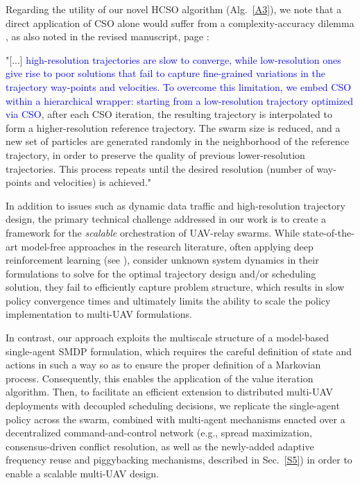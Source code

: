 \documentclass[12pt, draftcls, onecolumn]{IEEEtran}
\theoremstyle{plain}
\theoremstyle{definition}
\theoremstyle{remark}
\newcommand\hlt[1]{\textcolor{blue}{#1}}
\begin{document}
\begin{enumerate}
Regarding the utility of our novel HCSO algorithm (Alg.~\ref{A3}), we note that a direct application of CSO alone would suffer from a complexity-accuracy dilemma \cite{CSO}, as also noted in the revised manuscript, page \pageref{dilemma}:

"[...] \hlt{high-resolution trajectories are slow to converge, while low-resolution ones give rise to poor solutions that fail to capture fine-grained variations in the trajectory way-points and velocities. To overcome this limitation, we embed CSO  within a hierarchical wrapper: starting from a low-resolution trajectory optimized via CSO}, after each CSO iteration, the resulting trajectory is interpolated to form a higher-resolution reference trajectory. The swarm size is reduced, and a new set of particles are generated randomly in the neighborhood of the reference trajectory, in order to preserve the quality of previous lower-resolution trajectories. This process repeats until the desired resolution (number of way-points and velocities) is achieved."
\vspace{2mm}

In addition to issues such as dynamic data traffic and high-resolution trajectory design, the primary technical challenge addressed in our work is to create a framework for the \emph{scalable} orchestration of UAV-relay swarms. While state-of-the-art model-free approaches in the research literature, often applying deep reinforcement learning (see \cite{DDQN, MEC-DDPG, DQNPositioning, MLDeployment}), consider unknown system dynamics in their formulations to solve for the optimal trajectory design and/or scheduling solution, they fail to efficiently capture problem structure, which results in slow policy convergence times and ultimately limits the ability to scale the policy implementation to multi-UAV formulations.
\vspace{2mm}

In contrast, our approach exploits the multiscale structure of a model-based single-agent SMDP formulation, which requires the careful definition of state and actions in such a way so as to ensure the proper definition of a Markovian process. Consequently, this enables the application of the value iteration algorithm. Then, to facilitate an efficient extension to distributed multi-UAV deployments with decoupled scheduling decisions, we replicate the single-agent policy across the swarm, combined with multi-agent mechanisms enacted over a decentralized command-and-control network (e.g., spread maximization, consensus-driven conflict resolution,
as well as the newly-added
adaptive frequency reuse and piggybacking mechanisms, described in Sec.~\ref{S5}) in order to enable a scalable multi-UAV design.
\vspace{2mm}


\end{enumerate}
\end{document}
